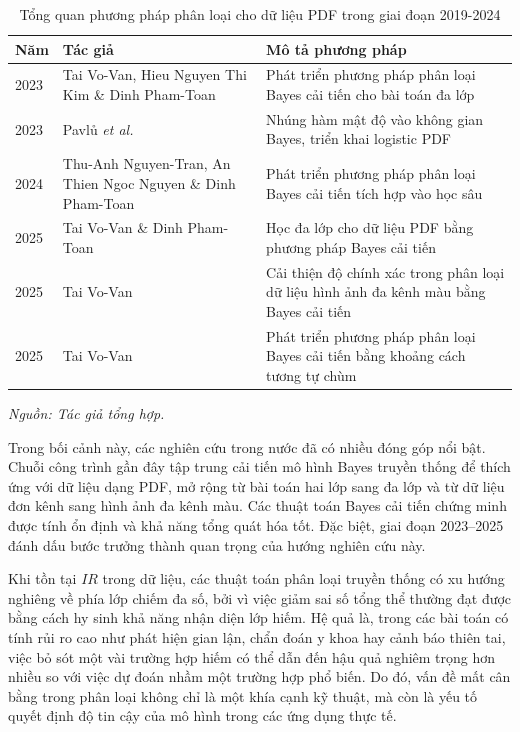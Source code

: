 \documentclass[a4paper,oneside]{book} %
\theoremstyle{plain}
\theoremstyle{plain}
\theoremstyle{nonumberplain}
\begin{document}
\begin{table}[H]
	\centering
	\fontsize{11pt}{14pt}\selectfont
	\caption{Tổng quan phương pháp phân loại cho dữ liệu PDF trong giai đoạn 2019-2024}
	\label{tab:pdf_classification_summary}
	\begin{tabular*}{\textwidth}{@{\extracolsep\fill}lp{6cm}p{8cm}@{\extracolsep\fill}}
		\toprule
		\textbf{Năm} & \textbf{Tác giả} & \textbf{Mô tả phương pháp} \\
		\midrule
		2023 & Tai Vo-Van, Hieu Nguyen Thi Kim \& Dinh Pham-Toan \cite{vovan2023multi} & Phát triển phương pháp phân loại Bayes cải tiến cho bài toán đa lớp\\
		2023 & Pavlů \textit{et al.} \cite{pavluu2023classification} & Nhúng hàm mật độ vào không gian Bayes, triển khai logistic PDF \\
		2024 & Thu-Anh Nguyen-Tran, An Thien Ngoc Nguyen \& Dinh Pham-Toan\cite{tran2025novel}& Phát triển phương pháp phân loại Bayes cải tiến tích hợp vào học sâu\\
		2025 & Tai Vo-Van \& Dinh Pham-Toan \cite{vo2024supervised} & Học đa lớp cho dữ liệu PDF bằng phương pháp Bayes cải tiến\\
		2025 & Tai Vo-Van \cite{vovan2025classifying} & Cải thiện độ chính xác trong phân loại dữ liệu hình ảnh đa kênh màu bằng Bayes cải tiến \\
		2025 & Tai Vo-Van \cite{vo2025developing} &  Phát triển phương pháp phân loại Bayes cải tiến bằng khoảng cách tương tự chùm \\
		\bottomrule
	\end{tabular*}
	\begin{minipage}{\textwidth}
		\fontsize{11pt}{14pt}\selectfont\it
		Nguồn: Tác giả tổng hợp.
	\end{minipage}
\end{table}


Trong bối cảnh này, các nghiên cứu trong nước đã có nhiều đóng góp nổi bật. Chuỗi công trình gần đây tập trung cải tiến mô hình Bayes truyền thống để thích ứng với dữ liệu dạng PDF, mở rộng từ bài toán hai lớp sang đa lớp và từ dữ liệu đơn kênh sang hình ảnh đa kênh màu. Các thuật toán Bayes cải tiến chứng minh được tính ổn định và khả năng tổng quát hóa tốt. Đặc biệt, giai đoạn 2023--2025 đánh dấu bước trưởng thành quan trọng của hướng nghiên cứu này.



Khi tồn tại $IR$ trong dữ liệu, các thuật toán phân loại truyền thống có xu hướng nghiêng về phía lớp chiếm đa số, bởi vì việc giảm sai số tổng thể thường đạt được bằng cách hy sinh khả năng nhận diện lớp hiếm. Hệ quả là, trong các bài toán có tính rủi ro cao như phát hiện gian lận, chẩn đoán y khoa hay cảnh báo thiên tai, việc bỏ sót một vài trường hợp hiếm có thể dẫn đến hậu quả nghiêm trọng hơn nhiều so với việc dự đoán nhầm một trường hợp phổ biến. Do đó, vấn đề mất cân bằng trong phân loại không chỉ là một khía cạnh kỹ thuật, mà còn là yếu tố quyết định độ tin cậy của mô hình trong các ứng dụng thực tế.
\end{document}
